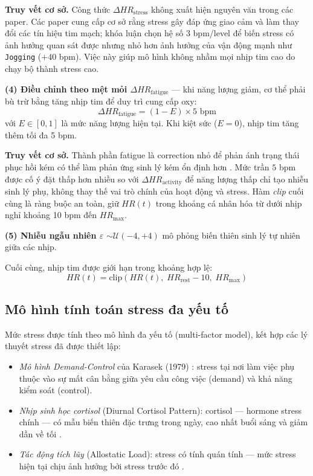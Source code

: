 \textbf{Truy vết cơ sở.} Công thức $\Delta HR_{\text{stress}}$ không xuất hiện nguyên văn trong các paper. Các paper cung cấp cơ sở rằng stress gây đáp ứng giao cảm và làm thay đổi các tín hiệu tim mạch; khóa luận chọn hệ số $3$ bpm/level để biến stress có ảnh hưởng quan sát được nhưng nhỏ hơn ảnh hưởng của vận động mạnh như \texttt{Jogging} ($+40$ bpm). Việc này giúp mô hình không nhầm mọi nhịp tim cao do chạy bộ thành stress cao.

\textbf{(4) Điều chỉnh theo mệt mỏi $\Delta HR_{\text{fatigue}}$} — khi năng lượng giảm, cơ thể phải bù trừ bằng tăng nhịp tim để duy trì cung cấp oxy:
\begin{equation}
    \Delta HR_{\text{fatigue}} = (1 - E) \times 5 \text{ bpm}
\end{equation}
với $E \in [0, 1]$ là mức năng lượng hiện tại. Khi kiệt sức ($E = 0$), nhịp tim tăng thêm tối đa 5 bpm.

\textbf{Truy vết cơ sở.} Thành phần fatigue là correction nhỏ để phản ánh trạng thái phục hồi kém có thể làm phản ứng sinh lý kém ổn định hơn \cite{mcewen2008central}. Mức trần $5$ bpm được cố ý đặt thấp hơn nhiều so với $\Delta HR_{\text{activity}}$ để năng lượng thấp chỉ tạo nhiễu sinh lý phụ, không thay thế vai trò chính của hoạt động và stress. Hàm \textit{clip} cuối cùng là ràng buộc an toàn, giữ $HR(t)$ trong khoảng cá nhân hóa từ dưới nhịp nghỉ khoảng 10 bpm đến $HR_{\max}$.

\textbf{(5) Nhiễu ngẫu nhiên $\varepsilon$} $\sim \mathcal{U}(-4, +4)$ mô phỏng biến thiên sinh lý tự nhiên giữa các nhịp.

Cuối cùng, nhịp tim được giới hạn trong khoảng hợp lệ:
\begin{equation}
    HR(t) = \text{clip}(HR(t), \; HR_{\text{rest}} - 10, \; HR_{\max})
\end{equation}

\subsection{Mô hình tính toán stress đa yếu tố}
\label{subsec:stress_calculation}

Mức stress được tính theo mô hình đa yếu tố (multi-factor model), kết hợp các lý thuyết stress đã được thiết lập:

\begin{itemize}
    \item \textit{Mô hình Demand-Control} của Karasek (1979) \cite{karasek1979job}: stress tại nơi làm việc phụ thuộc vào sự mất cân bằng giữa yêu cầu công việc (demand) và khả năng kiểm soát (control).
    \item \textit{Nhịp sinh học cortisol} (Diurnal Cortisol Pattern): cortisol — hormone stress chính — có mẫu biến thiên đặc trưng trong ngày, cao nhất buổi sáng và giảm dần về tối \cite{chrousos2009stress}.
    \item \textit{Tác động tích lũy} (Allostatic Load): stress có tính quán tính — mức stress hiện tại chịu ảnh hưởng bởi stress trước đó \cite{mcewen2008central}.
\end{itemize}


